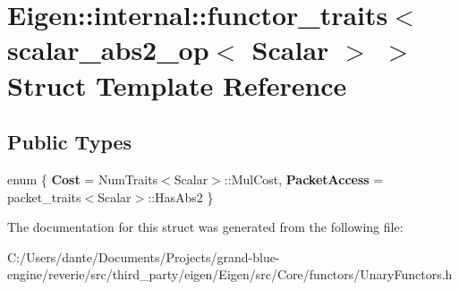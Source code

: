 \hypertarget{struct_eigen_1_1internal_1_1functor__traits_3_01scalar__abs2__op_3_01_scalar_01_4_01_4}{}\section{Eigen\+::internal\+::functor\+\_\+traits$<$ scalar\+\_\+abs2\+\_\+op$<$ Scalar $>$ $>$ Struct Template Reference}
\label{struct_eigen_1_1internal_1_1functor__traits_3_01scalar__abs2__op_3_01_scalar_01_4_01_4}
\subsection*{Public Types}
\begin{DoxyCompactItemize}
\item 
\mbox{\label{struct_eigen_1_1internal_1_1functor__traits_3_01scalar__abs2__op_3_01_scalar_01_4_01_4_a2027be4baf198cb9ca8ede3b6d8589f6}} 
enum \{ {\bfseries Cost} = Num\+Traits$<$Scalar$>$\+::Mul\+Cost, 
{\bfseries Packet\+Access} = packet\+\_\+traits$<$Scalar$>$\+::Has\+Abs2
 \}
\end{DoxyCompactItemize}


The documentation for this struct was generated from the following file\+:\begin{DoxyCompactItemize}
\item 
C\+:/\+Users/dante/\+Documents/\+Projects/grand-\/blue-\/engine/reverie/src/third\+\_\+party/eigen/\+Eigen/src/\+Core/functors/Unary\+Functors.\+h\end{DoxyCompactItemize}
